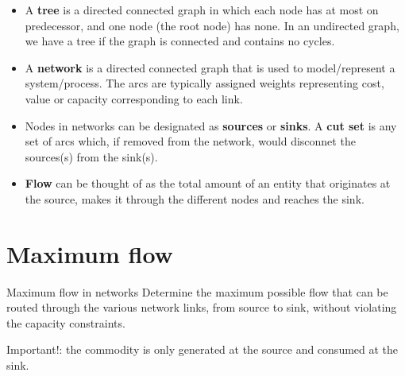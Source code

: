\documentclass[c]{beamer}
\begin{document}
\begin{frame}
  \begin{itemize}
    \item A {\bf tree} is a directed connected graph in which each node has at most on predecessor, and one node (the root node) has none. In an undirected graph, we have a tree if the graph is connected and contains no cycles.
    \item A {\bf network} is a directed connected graph that is used to model/represent a system/process. The arcs are typically assigned weights representing cost, value or capacity corresponding to each link.
    \item Nodes in networks can be designated as {\bf sources} or {\bf sinks}. A {\bf cut set} is any set of arcs which, if removed from the network, would disconnet the sources(s) from the sink(s).
    \item {\bf Flow} can be thought of as the total amount of an entity that originates at the source, makes it through the different nodes and reaches the sink.
  \end{itemize}
\end{frame}

\section{Maximum flow}

\begin{frame}
  \begin{block}{Maximum flow in networks}
    Determine the maximum possible flow that can be routed through the various network links, from source to sink, without violating the capacity constraints.

    Important!: the commodity is only generated at the source and consumed at the sink.
  \end{block}
\end{frame}
\end{document}
